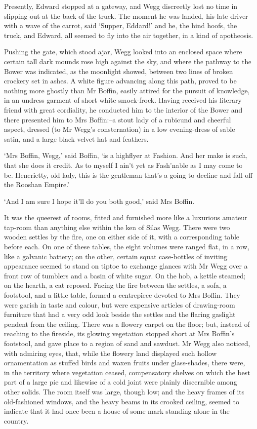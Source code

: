 Presently, Edward stopped at a gateway, and Wegg discreetly lost no time
in slipping out at the back of the truck. The moment he was landed, his
late driver with a wave of the carrot, said ‘Supper, Eddard!’ and he,
the hind hoofs, the truck, and Edward, all seemed to fly into the air
together, in a kind of apotheosis.

Pushing the gate, which stood ajar, Wegg looked into an enclosed space
where certain tall dark mounds rose high against the sky, and where the
pathway to the Bower was indicated, as the moonlight showed, between two
lines of broken crockery set in ashes. A white figure advancing along
this path, proved to be nothing more ghostly than Mr Boffin, easily
attired for the pursuit of knowledge, in an undress garment of short
white smock-frock. Having received his literary friend with great
cordiality, he conducted him to the interior of the Bower and there
presented him to Mrs Boffin:--a stout lady of a rubicund and cheerful
aspect, dressed (to Mr Wegg’s consternation) in a low evening-dress of
sable satin, and a large black velvet hat and feathers.

‘Mrs Boffin, Wegg,’ said Boffin, ‘is a highflyer at Fashion. And her
make is such, that she does it credit. As to myself I ain’t yet as
Fash’nable as I may come to be. Henerietty, old lady, this is the
gentleman that’s a going to decline and fall off the Rooshan Empire.’

‘And I am sure I hope it’ll do you both good,’ said Mrs Boffin.

It was the queerest of rooms, fitted and furnished more like a luxurious
amateur tap-room than anything else within the ken of Silas Wegg. There
were two wooden settles by the fire, one on either side of it, with
a corresponding table before each. On one of these tables, the eight
volumes were ranged flat, in a row, like a galvanic battery; on the
other, certain squat case-bottles of inviting appearance seemed to stand
on tiptoe to exchange glances with Mr Wegg over a front row of tumblers
and a basin of white sugar. On the hob, a kettle steamed; on the hearth,
a cat reposed. Facing the fire between the settles, a sofa, a footstool,
and a little table, formed a centrepiece devoted to Mrs Boffin.
They were garish in taste and colour, but were expensive articles of
drawing-room furniture that had a very odd look beside the settles
and the flaring gaslight pendent from the ceiling. There was a flowery
carpet on the floor; but, instead of reaching to the fireside, its
glowing vegetation stopped short at Mrs Boffin’s footstool, and gave
place to a region of sand and sawdust. Mr Wegg also noticed, with
admiring eyes, that, while the flowery land displayed such hollow
ornamentation as stuffed birds and waxen fruits under glass-shades,
there were, in the territory where vegetation ceased, compensatory
shelves on which the best part of a large pie and likewise of a cold
joint were plainly discernible among other solids. The room itself was
large, though low; and the heavy frames of its old-fashioned windows,
and the heavy beams in its crooked ceiling, seemed to indicate that it
had once been a house of some mark standing alone in the country.

